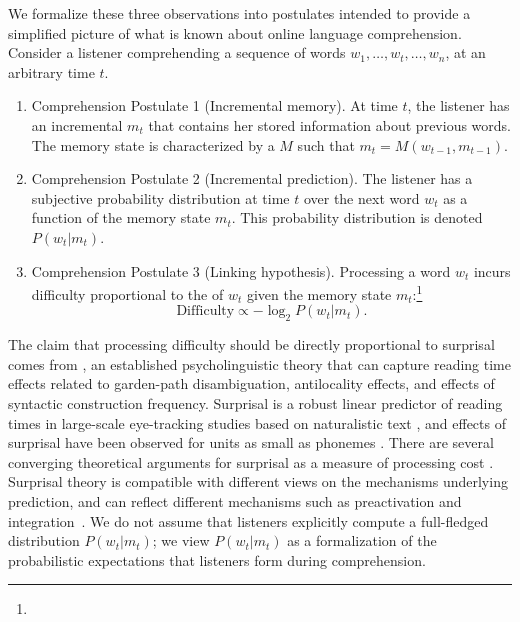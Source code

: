 We formalize these three observations into postulates intended to provide a simplified picture of what is known about online language comprehension. Consider a listener comprehending a sequence of words $w_1, \dots, w_t, \dots, w_n$, at an arbitrary time $t$.
\begin{enumerate}
    \item Comprehension Postulate 1 (Incremental memory). At time $t$, the listener has an incremental  $m_t$ that contains her stored information about previous words. The memory state is characterized by a  $M$ such that $m_t = M(w_{t-1}, m_{t-1})$.
    \item Comprehension Postulate 2 (Incremental prediction). The listener has a subjective probability distribution at time $t$ over the next word $w_t$ as a function of the memory state $m_t$. This probability distribution is denoted $P(w_t|m_t)$.
    \item Comprehension Postulate 3 (Linking hypothesis). Processing a word $w_t$ incurs difficulty proportional to the  of $w_t$ given the memory state $m_t$:\footnote{}
    \begin{equation}
    \label{eq:lossy-surp}
    \text{Difficulty} \propto -\log_2 P(w_t | m_t).
\end{equation}
\end{enumerate}
The claim that processing difficulty should be directly proportional to surprisal comes from  \citep{hale2001probabilistic,levy2008expectation}, an established psycholinguistic theory that can capture reading time effects related to garden-path disambiguation, antilocality effects, and effects of syntactic construction frequency. Surprisal is a robust linear predictor of reading times in large-scale eye-tracking studies based on naturalistic text \citep{smith2013effect,goodkind-predictive-2018,frank2019interaction,aurnhammer2019evaluating,wilcox2020predictive}, and effects of surprisal have been observed for units as small as phonemes \citep{gwilliams2020neural}. There are several converging theoretical arguments for surprisal as a measure of processing cost \citep{levy2008expectation,smith2013effect}.
Surprisal theory is compatible with different views on the mechanisms underlying prediction, and can reflect different mechanisms such as preactivation and integration~\citep{kuperberg2016we}.
We do not assume that listeners explicitly compute a full-fledged distribution $P(w_t|m_t)$; we view $P(w_t|m_t)$ as a formalization of the probabilistic expectations that listeners form during comprehension.


